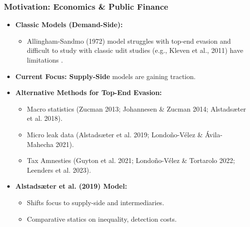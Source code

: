 \documentclass{beamer}
\begin{document}
\begin{frame}
    \frametitle{Motivation: Economics \& Public Finance}

    \begin{itemize}
        \item \textbf{Classic Models (Demand-Side):}
            \begin{itemize}
                \item Allingham-Sandmo (1972) model struggles with top-end evasion and difficult to study with classic udit studies (e.g., Kleven et al., 2011) have limitations .
            \end{itemize}
    \end{itemize}

    \begin{itemize}
        \item \textbf{Current Focus: Supply-Side} models are gaining traction.
        \item \textbf{Alternative Methods for Top-End Evasion:}
            \begin{itemize}
                \item Macro statistics (Zucman 2013; Johannesen \& Zucman 2014; Alstadsæter et al. 2018).
                \item Micro leak data (Alstadsæter et al. 2019; Londoño-Vélez \& Ávila-Mahecha 2021).
                \item Tax Amnesties (Guyton et al. 2021; Londoño-Vélez \& Tortarolo 2022; Leenders et al. 2023).
            \end{itemize}
        \item \textbf{Alstadsæter et al. (2019) Model:}
            \begin{itemize}
                \item Shifts focus to supply-side and intermediaries.
                \item Comparative statics on inequality, detection costs.
            \end{itemize}
    \end{itemize}
\end{frame}
\end{document}
